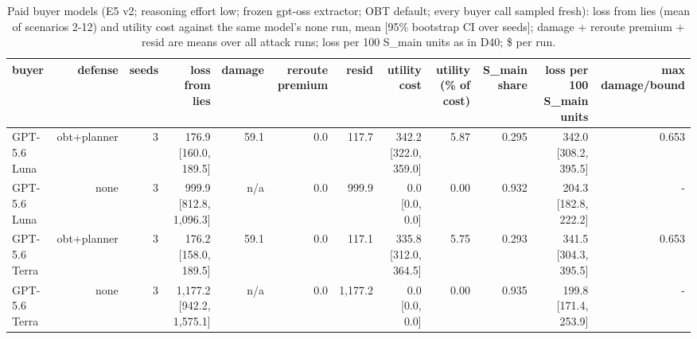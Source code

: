 \begin{table}[t]
\centering
\small
\caption{Paid buyer models (E5 v2; reasoning effort low; frozen gpt-oss extractor; OBT default; every buyer call sampled fresh): loss from lies (mean of scenarios 2-12) and utility cost against the same model's none run, mean [95\% bootstrap CI over seeds]; damage + reroute premium + resid are means over all attack runs; loss per 100 S\_main units as in D40; \$ per run.}
\label{tab:e5}
\begin{tabular}{lrrrrrrrrrrr}
\toprule
buyer & defense & seeds & loss from lies & damage & reroute premium & resid & utility cost & utility (\% of cost) & S\_main share & loss per 100 S\_main units & max damage/bound \\
\midrule
GPT-5.6 Luna & obt+planner & 3 & 176.9 [160.0, 189.5] & 59.1 & 0.0 & 117.7 & 342.2 [322.0, 359.0] & 5.87 & 0.295 & 342.0 [308.2, 395.5] & 0.653 \\
GPT-5.6 Luna & none & 3 & 999.9 [812.8, 1,096.3] & n/a & 0.0 & 999.9 & 0.0 [0.0, 0.0] & 0.00 & 0.932 & 204.3 [182.8, 222.2] & - \\
GPT-5.6 Terra & obt+planner & 3 & 176.2 [158.0, 189.5] & 59.1 & 0.0 & 117.1 & 335.8 [312.0, 364.5] & 5.75 & 0.293 & 341.5 [304.3, 395.5] & 0.653 \\
GPT-5.6 Terra & none & 3 & 1,177.2 [942.2, 1,575.1] & n/a & 0.0 & 1,177.2 & 0.0 [0.0, 0.0] & 0.00 & 0.935 & 199.8 [171.4, 253.9] & - \\
\bottomrule
\end{tabular}
\end{table}
